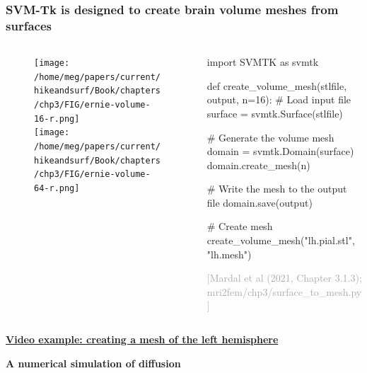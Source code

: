 \documentclass[mathserif, aspectratio=169]{beamer}
\newcommand{\refer}[1]{\begin{flushright}{\tiny \textcolor{darkgray}{[#1]}}\end{flushright}}
\newcommand{\mysection}[1]{\begin{frame} \begin{center} \vspace{3em} \textbf{#1} \end{center} \end{frame}}
\newcommand{\videosection}[2]{\begin{frame} \begin{center} \vspace{3em} \href{#2}{\textcolor{rognesred}{\textbf{#1}}} \end{center} \end{frame}}
\begin{document}
\begin{frame}[fragile]
\frametitle{SVM-Tk is designed to create brain volume meshes from surfaces}

\begin{columns}
\begin{column}{0.34\textwidth}
\begin{figure}
  \centering
  \texttt{[image: /home/meg/papers/current/hikeandsurf/Book/chapters/chp3/FIG/ernie-volume-16-r.png]} \\
  \texttt{[image: /home/meg/papers/current/hikeandsurf/Book/chapters/chp3/FIG/ernie-volume-64-r.png]}
\end{figure}
\end{column}
\begin{column}{0.65\textwidth}
  \begin{python}
import SVMTK as svmtk

def create_volume_mesh(stlfile, output, n=16):
    # Load input file
    surface = svmtk.Surface(stlfile)
    
    # Generate the volume mesh
    domain = svmtk.Domain(surface)
    domain.create_mesh(n)

    # Write the mesh to the output file
    domain.save(output)

# Create mesh    
create_volume_mesh("lh.pial.stl", "lh.mesh")
  \end{python}
  \refer{Mardal et al (2021, Chapter 3.1.3); mri2fem/chp3/surface\_to\_mesh.py}
\end{column}
\end{columns}

\end{frame}

\videosection{Video example: creating a mesh of the left hemisphere}{}

\mysection{A numerical simulation of diffusion}
\end{document}
